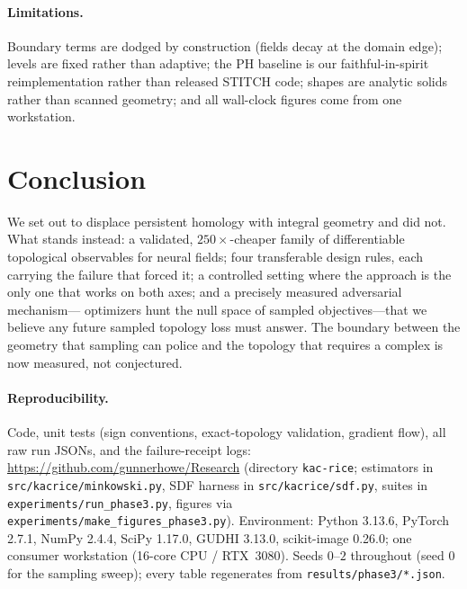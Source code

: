 \documentclass[10pt]{article}
\begin{document}
\paragraph{Limitations.} Boundary terms are dodged by construction (fields decay at
the domain edge); levels are fixed rather than adaptive; the PH baseline is our
faithful-in-spirit reimplementation rather than released STITCH code; shapes are
analytic solids rather than scanned geometry; and all wall-clock figures come from one
workstation.

\section{Conclusion}

We set out to displace persistent homology with integral geometry and did not.
What stands instead: a validated, $250\times$-cheaper family of differentiable
topological observables for neural fields; four transferable design rules, each
carrying the failure that forced it; a controlled setting where the approach is the
only one that works on both axes; and a precisely measured adversarial mechanism---
optimizers hunt the null space of sampled objectives---that we believe any future
sampled topology loss must answer. The boundary between the geometry that sampling
can police and the topology that requires a complex is now measured, not conjectured.

\paragraph{Reproducibility.} Code, unit tests (sign conventions, exact-topology
validation, gradient flow), all raw run JSONs, and the failure-receipt logs:
\url{https://github.com/gunnerhowe/Research} (directory \texttt{kac-rice};
estimators in \texttt{src/kacrice/minkowski.py}, SDF harness in
\texttt{src/kacrice/sdf.py}, suites in \texttt{experiments/run\_phase3.py}, figures
via \texttt{experiments/make\_figures\_phase3.py}). Environment: Python 3.13.6,
PyTorch 2.7.1, NumPy 2.4.4, SciPy 1.17.0, GUDHI 3.13.0, scikit-image 0.26.0; one
consumer workstation (16-core CPU / RTX~3080). Seeds $0$--$2$ throughout (seed $0$
for the sampling sweep); every table regenerates from
\texttt{results/phase3/*.json}.



\end{document}
